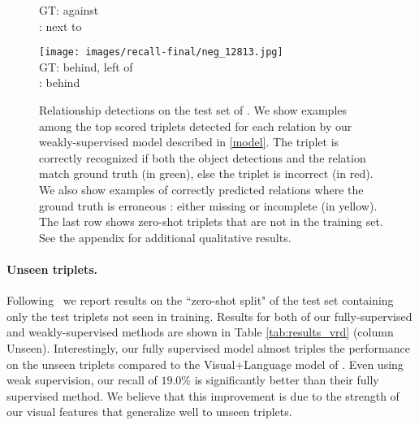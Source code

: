 \documentclass[10pt,twocolumn,letterpaper]{article}
\newcommand{\spaceparagraph}{\vspace{-.35cm}}
\begin{document}
\begin{figure*}[t]
\begin{minipage}[b]{0.18\textwidth}
    		\vspace{0.2ex}
    		\small{
       	GT: against\\
       	\cite{Lu16}: next to
       	}
       	\vspace{0.3ex}
    \end{minipage}
    \hspace{0.005\textwidth}
    \begin{minipage}[b]{0.18\textwidth}
    	\centering
       	\texttt{[image: images/recall-final/neg\_12813.jpg]}\\
       	\vspace{0.2ex}
       	\small{
       	GT: behind, left of\\
       	\cite{Lu16}: behind
       	}
       	\vspace{0.3ex}
    \end{minipage}   
     
    \setlength\abovecaptionskip{5pt}
    \caption{Relationship detections on the test set of \cite{Lu16}. We show examples among the top scored triplets detected for each relation by our weakly-supervised model described in \ref{model}. The triplet is correctly recognized if both the object detections and the relation match ground truth (in green), else the triplet is incorrect (in red). We also show examples of correctly predicted relations where the ground truth is erroneous : either missing or incomplete (in yellow). The last row shows zero-shot triplets that are not in the training set. See the appendix for additional qualitative results.}
    \vspace{-.4cm}
    \label{fig:relationship_detection_all}
\end{figure*}






\spaceparagraph
\paragraph{Unseen triplets.} Following~\cite{Lu16} we report results on the ``zero-shot split" of the test set containing only the test triplets not seen in training. Results for both of our fully-supervised and weakly-supervised methods are shown in Table \ref{tab:results_vrd} (column Unseen). Interestingly, our fully supervised model almost triples the performance on the unseen triplets compared to the Visual+Language model of \cite{Lu16}. Even using weak supervision, our recall of $19.0\%$ is significantly better than their fully supervised method. We believe that this improvement is due to the strength of our visual features that generalize well to unseen triplets. 
\end{document}
